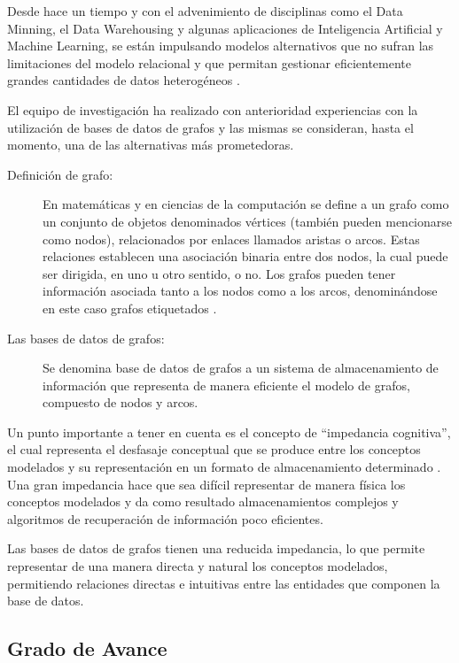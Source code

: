 \documentclass[
	11pt,oneside,a4paper,
	fleqn,
	article
]{memoir}
\begin{document}
Desde hace un tiempo y con el advenimiento de disciplinas como el Data Minning, el Data Warehousing y algunas aplicaciones de Inteligencia Artificial y Machine Learning, se están impulsando modelos alternativos que no sufran las limitaciones del modelo relacional y que permitan gestionar eficientemente grandes cantidades de datos heterogéneos  \parencite{vicknair2010comparison}. 

El equipo de investigación ha realizado con anterioridad experiencias con la utilización de bases de datos de grafos y las mismas se consideran, hasta el momento, una de las alternativas más prometedoras.

\begin{description}
	\item[Definición de grafo:]{
		En matemáticas y en ciencias de la computación se define a un grafo como un	conjunto de objetos denominados vértices (también pueden mencionarse como nodos), relacionados por enlaces llamados aristas o arcos. Estas relaciones establecen una asociación binaria entre dos nodos, la cual puede ser dirigida, en uno u otro sentido, o no. Los grafos pueden tener información asociada tanto a los nodos como a los arcos, denominándose en este caso grafos etiquetados  \parencite{van2008handbook}. }

	\item[Las bases de datos de grafos:]{
		Se denomina base de datos de grafos a un sistema de almacenamiento de información que representa de manera eficiente el modelo de grafos, compuesto de nodos y arcos.}
\end{description}

Un punto importante a tener en cuenta es el concepto de ``impedancia cognitiva'', el cual representa el desfasaje conceptual que se produce entre los conceptos modelados y su representación en un formato de almacenamiento determinado  \parencite{robinson2015graph}. Una gran impedancia hace que sea difícil representar de manera física los conceptos modelados y da como resultado almacenamientos complejos y algoritmos de recuperación de información poco eficientes.

Las bases de datos de grafos tienen una reducida impedancia, lo que permite representar de una manera directa y natural los conceptos modelados, permitiendo relaciones directas e intuitivas entre las entidades que componen la base de datos.

\subsection{Grado de Avance}
\end{document}
